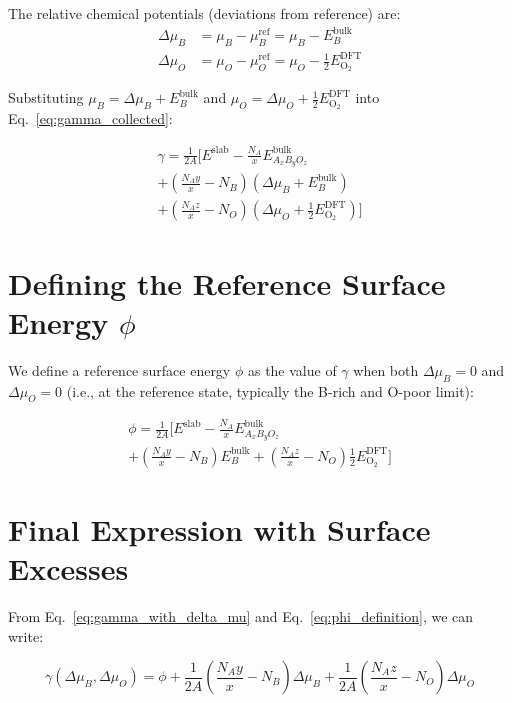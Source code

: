 \documentclass[11pt]{article}
\begin{document}
The relative chemical potentials (deviations from reference) are:
\begin{align}
\Delta\mu_B &= \mu_B - \mu_B^{\text{ref}} = \mu_B - E_B^{\text{bulk}} \label{eq:delta_mu_B} \\
\Delta\mu_O &= \mu_O - \mu_O^{\text{ref}} = \mu_O - \frac{1}{2} E_{\text{O}_2}^{\text{DFT}} \label{eq:delta_mu_O}
\end{align}

Substituting $\mu_B = \Delta\mu_B + E_B^{\text{bulk}}$ and $\mu_O = \Delta\mu_O + \frac{1}{2} E_{\text{O}_2}^{\text{DFT}}$ into Eq.~\ref{eq:gamma_collected}:

\begin{multline}
\gamma = \frac{1}{2A} \Bigg[ E^{\text{slab}} - \frac{N_A}{x} E_{A_xB_yO_z}^{\text{bulk}} \\
+ \left(\frac{N_A y}{x} - N_B\right) \left(\Delta\mu_B + E_B^{\text{bulk}}\right) \\
+ \left(\frac{N_A z}{x} - N_O\right) \left(\Delta\mu_O + \frac{1}{2} E_{\text{O}_2}^{\text{DFT}}\right) \Bigg]
\label{eq:gamma_with_delta_mu}
\end{multline}

\section{Defining the Reference Surface Energy $\phi$}

We define a reference surface energy $\phi$ as the value of $\gamma$ when both $\Delta\mu_B = 0$ and $\Delta\mu_O = 0$ (i.e., at the reference state, typically the B-rich and O-poor limit):

\begin{multline}
\phi = \frac{1}{2A} \Bigg[ E^{\text{slab}} - \frac{N_A}{x} E_{A_xB_yO_z}^{\text{bulk}} \\
+ \left(\frac{N_A y}{x} - N_B\right) E_B^{\text{bulk}} + \left(\frac{N_A z}{x} - N_O\right) \frac{1}{2} E_{\text{O}_2}^{\text{DFT}} \Bigg]
\label{eq:phi_definition}
\end{multline}

\section{Final Expression with Surface Excesses}

From Eq.~\ref{eq:gamma_with_delta_mu} and Eq.~\ref{eq:phi_definition}, we can write:

\begin{equation}
\gamma(\Delta\mu_B, \Delta\mu_O) = \phi + \frac{1}{2A}\left(\frac{N_A y}{x} - N_B\right) \Delta\mu_B + \frac{1}{2A}\left(\frac{N_A z}{x} - N_O\right) \Delta\mu_O
\label{eq:gamma_with_phi}
\end{equation}
\end{document}
